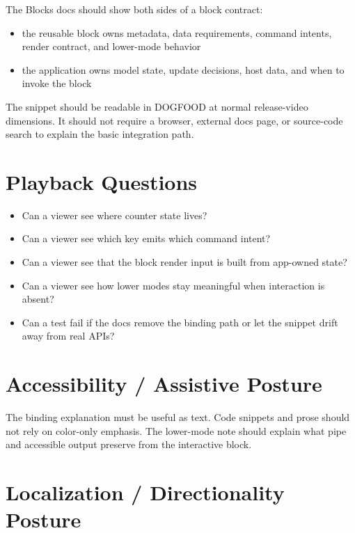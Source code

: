 The Blocks docs should show both sides of a block contract:

\begin{itemize}
\tightlist
\item
  the reusable block owns metadata, data requirements, command intents, render contract, and lower-mode behavior
\item
  the application owns model state, update decisions, host data, and when to invoke the block
\end{itemize}

The snippet should be readable in DOGFOOD at normal release-video dimensions. It should not require a browser, external docs page, or source-code search to explain the basic integration path.

\section{Playback Questions}\label{record-143-playback-questions}

\begin{itemize}
\tightlist
\item
  Can a viewer see where counter state lives?
\item
  Can a viewer see which key emits which command intent?
\item
  Can a viewer see that the block render input is built from app-owned state?
\item
  Can a viewer see how lower modes stay meaningful when interaction is absent?
\item
  Can a test fail if the docs remove the binding path or let the snippet drift away from real APIs?
\end{itemize}

\section{Accessibility / Assistive Posture}\label{record-143-accessibility-assistive-posture}

The binding explanation must be useful as text. Code snippets and prose should not rely on color-only emphasis. The lower-mode note should explain what pipe and accessible output preserve from the interactive block.

\section{Localization / Directionality Posture}\label{record-143-localization-directionality-posture}

